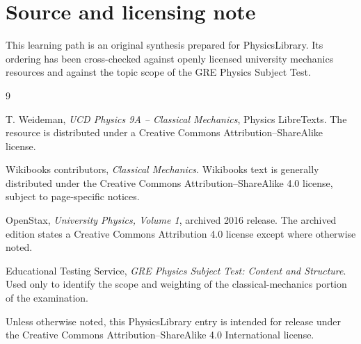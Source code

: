 \section{Source and licensing note}

This learning path is an original synthesis prepared for PhysicsLibrary.  Its ordering has been
cross-checked against openly licensed university mechanics resources and against the topic scope of
the GRE Physics Subject Test.

\begin{thebibliography}{9}

T. Weideman,
\emph{UCD Physics 9A -- Classical Mechanics}, Physics LibreTexts.
The resource is distributed under a Creative Commons Attribution--ShareAlike license.

Wikibooks contributors,
\emph{Classical Mechanics}.
Wikibooks text is generally distributed under the Creative Commons Attribution--ShareAlike 4.0
license, subject to page-specific notices.

OpenStax,
\emph{University Physics, Volume 1}, archived 2016 release.
The archived edition states a Creative Commons Attribution 4.0 license except where otherwise noted.

Educational Testing Service,
\emph{GRE Physics Subject Test: Content and Structure}.
Used only to identify the scope and weighting of the classical-mechanics portion of the examination.

\end{thebibliography}

Unless otherwise noted, this PhysicsLibrary entry is intended for release under the Creative Commons
Attribution--ShareAlike 4.0 International license.
